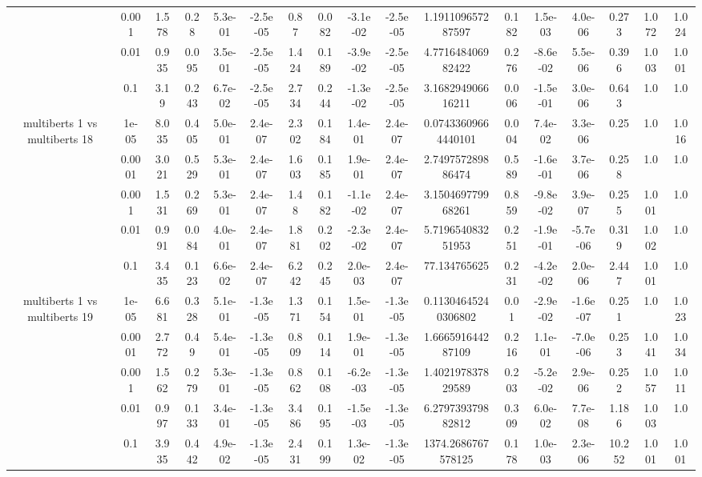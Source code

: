 \begin{tabular}{|c|c|c|c|c|c|c|c|c|c|c|c|c|c|c|c|c|}
 & 0.001 & 1.578 & 0.28 & 5.3e-01 & -2.5e-05 & 0.87 & 0.082 & -3.1e-02 & -2.5e-05 & 1.191109657287597 & 0.182 & 1.5e-03 & 4.0e-06 & 0.273 & 1.072 & 1.024 \\
 & 0.01 & 0.935 & 0.095 & 3.5e-01 & -2.5e-05 & 1.424 & 0.189 & -3.9e-02 & -2.5e-05 & 4.771648406982422 & 0.276 & -8.6e-02 & 5.5e-06 & 0.396 & 1.003 & 1.001 \\
 & 0.1 & 3.19 & 0.243 & 6.7e-02 & -2.5e-05 & 2.734 & 0.244 & -1.3e-02 & -2.5e-05 & 3.168294906616211 & 0.006 & -1.5e-01 & 3.0e-06 & 0.643 & 1.0 & 1.0 \\
\hline
\multirow{5}{*}{multiberts 1 vs multiberts 18} & 1e-05 & 8.035 & 0.405 & 5.0e-01 & 2.4e-07 & 2.302 & 0.184 & 1.4e-01 & 2.4e-07 & 0.07433609664440101 & 0.004 & 7.4e-02 & 3.3e-06 & 0.25 & 1.0 & 1.016 \\
 & 0.0001 & 3.021 & 0.529 & 5.3e-01 & 2.4e-07 & 1.603 & 0.185 & 1.9e-01 & 2.4e-07 & 2.749757289886474 & 0.589 & -1.6e-01 & 3.7e-06 & 0.258 & 1.0 & 1.0 \\
 & 0.001 & 1.531 & 0.269 & 5.3e-01 & 2.4e-07 & 1.48 & 0.182 & -1.1e-02 & 2.4e-07 & 3.150469779968261 & 0.859 & -9.8e-02 & 3.9e-07 & 0.255 & 1.001 & 1.0 \\
 & 0.01 & 0.991 & 0.084 & 4.0e-01 & 2.4e-07 & 1.881 & 0.202 & -2.3e-02 & 2.4e-07 & 5.719654083251953 & 0.251 & -1.9e-01 & -5.7e-06 & 0.319 & 1.002 & 1.0 \\
 & 0.1 & 3.435 & 0.123 & 6.6e-02 & 2.4e-07 & 6.242 & 0.245 & 2.0e-03 & 2.4e-07 & 77.134765625 & 0.231 & -4.2e-02 & 2.0e-06 & 2.447 & 1.001 & 1.0 \\
\hline
\multirow{5}{*}{multiberts 1 vs multiberts 19} & 1e-05 & 6.681 & 0.328 & 5.1e-01 & -1.3e-05 & 1.371 & 0.154 & 1.5e-01 & -1.3e-05 & 0.11304645240306802 & 0.01 & -2.9e-02 & -1.6e-07 & 0.251 & 1.0 & 1.023 \\
 & 0.0001 & 2.772 & 0.49 & 5.4e-01 & -1.3e-05 & 0.809 & 0.114 & 1.9e-01 & -1.3e-05 & 1.666591644287109 & 0.216 & 1.1e-01 & -7.0e-06 & 0.253 & 1.041 & 1.034 \\
 & 0.001 & 1.562 & 0.279 & 5.3e-01 & -1.3e-05 & 0.862 & 0.108 & -6.2e-03 & -1.3e-05 & 1.402197837829589 & 0.203 & -5.2e-02 & 2.9e-06 & 0.252 & 1.057 & 1.011 \\
 & 0.01 & 0.997 & 0.133 & 3.4e-01 & -1.3e-05 & 3.486 & 0.195 & -1.5e-03 & -1.3e-05 & 6.279739379882812 & 0.309 & 6.0e-02 & 7.7e-08 & 1.186 & 1.003 & 1.0 \\
 & 0.1 & 3.935 & 0.442 & 4.9e-02 & -1.3e-05 & 2.431 & 0.199 & 1.3e-02 & -1.3e-05 & 1374.2686767578125 & 0.178 & 1.0e-03 & 2.3e-06 & 10.252 & 1.001 & 1.001 \\

\end{tabular}
